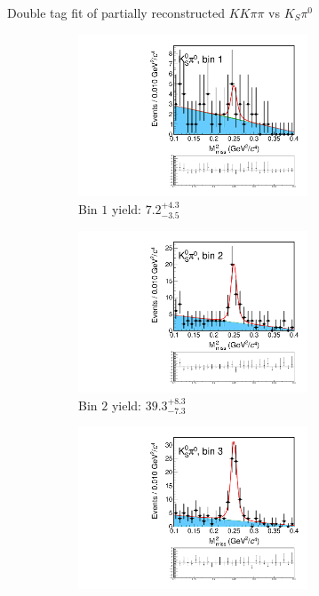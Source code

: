 \documentclass{beamer}
\begin{document}
\begin{frame}{Double tag fit of partially reconstructed $KK\pi\pi$ vs $K_S\pi^0$}
  \begin{figure}
    \centering
    \begin{subfigure}{0.5\textwidth}
      \centering
      \includegraphics[width=0.75\textwidth,trim={0 5cm 0 0},clip=true]{Plots/DoubleTagYield_DoubleTag_CP_KKpipi_vs_KSpi0PartReco_SignalBin1.pdf}
      \caption{Bin $1$ yield: $7.2_{-3.5}^{+4.3}$}
    \end{subfigure}%
    \begin{subfigure}{0.5\textwidth}
      \centering
      \includegraphics[width=0.75\textwidth,trim={0 5cm 0 0},clip=true]{Plots/DoubleTagYield_DoubleTag_CP_KKpipi_vs_KSpi0PartReco_SignalBin2.pdf}
      \caption{Bin $2$ yield: $39.3_{-7.3}^{+8.3}$}
    \end{subfigure}
    \begin{subfigure}{0.5\textwidth}
      \centering
      \includegraphics[width=0.75\textwidth,trim={0 5cm 0 0},clip=true]{Plots/DoubleTagYield_DoubleTag_CP_KKpipi_vs_KSpi0PartReco_SignalBin3.pdf}

\end{subfigure}
\end{figure}
\end{frame}
\end{document}
